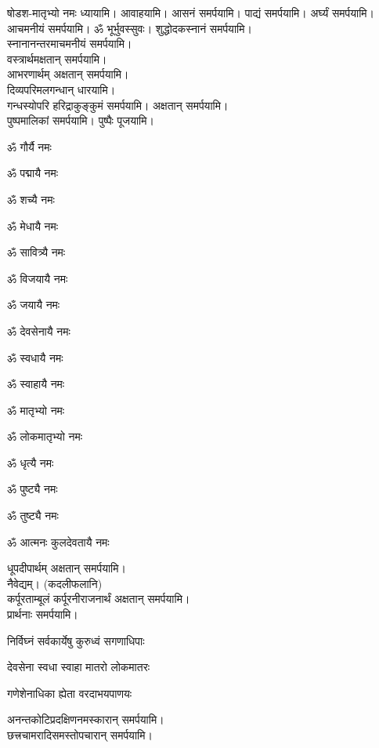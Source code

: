
षोडश-मातृभ्यो नमः ध्यायामि। आवाहयामि। आसनं समर्पयामि।
पाद्यं समर्पयामि। अर्घ्यं समर्पयामि। आचमनीयं समर्पयामि। 
ॐ भूर्भुवस्सुवः। शुद्धोदकस्नानं समर्पयामि।\\
स्नानानन्तरमाचमनीयं समर्पयामि।\\
वस्त्रार्थमक्षतान् समर्पयामि।\\
आभरणार्थम् अक्षतान् समर्पयामि।\\
दिव्यपरिमलगन्धान् धारयामि।\\
गन्धस्योपरि हरिद्राकुङ्कुमं समर्पयामि। अक्षतान् समर्पयामि। \\
पुष्पमालिकां समर्पयामि। पुष्पैः पूजयामि।

\begin{enumerate}%
\begin{minipage}{0.475\linewidth} 
\item ॐ गौर्यै नमः
\item ॐ पद्मायै नमः
\item ॐ शच्यै नमः
\item ॐ मेधायै नमः
\item ॐ सावित्र्यै नमः
\item ॐ विजयायै नमः
\item ॐ जयायै नमः
\item ॐ देवसेनायै नमः
  \end{minipage}
  \begin{minipage}{0.525\linewidth}
\item ॐ स्वधायै नमः
\item ॐ स्वाहायै नमः
\item ॐ मातृभ्यो नमः
\item ॐ लोकमातृभ्यो नमः
\item ॐ धृत्यै नमः
\item ॐ पुष्ट्यै नमः
\item ॐ तुष्ट्यै नमः
\item ॐ आत्मनः कुलदेवतायै नमः
  \end{minipage}
\end{enumerate}

\begin{center}

धूपदीपार्थम् अक्षतान् समर्पयामि।\\

नैवेद्यम्। (कदलीफलानि)\\
कर्पूरताम्बूलं कर्पूरनीराजनार्थं अक्षतान् समर्पयामि।\\
प्रार्थनाः समर्पयामि।

{निर्विघ्नं सर्वकार्येषु कुरुध्वं सगणाधिपाः}

{देवसेना स्वधा स्वाहा मातरो लोकमातरः}

{गणेशेनाधिका ह्येता वरदाभयपाणयः}

अनन्तकोटिप्रदक्षिणनमस्कारान् समर्पयामि।\\
छत्त्रचामरादिसमस्तोपचारान् समर्पयामि।\\

\end{center}
